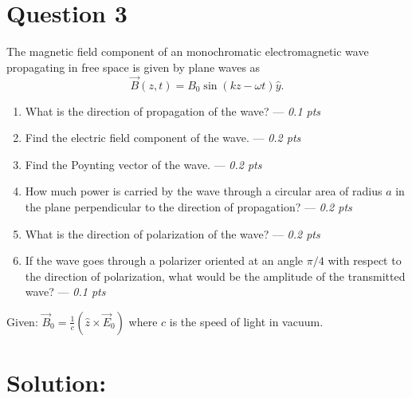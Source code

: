 \section*{Question 3}
The magnetic field component of an monochromatic electromagnetic wave propagating in free space is given by plane waves as
\begin{equation*}
\vec{B}(z,t) = B_0 \sin(kz - \omega t) \hat{y}.
\end{equation*}
\begin{enumerate}
    \item[(a)] What is the direction of propagation of the wave? --- \textit{0.1 pts} 
    \item[(b)] Find the electric field component of the wave. --- \textit{0.2 pts}
    \item[(c)] Find the Poynting vector of the wave. --- \textit{0.2 pts}
    \item[(d)] How much power is carried by the wave through a circular area of radius \(a\) in the plane perpendicular to the direction of propagation? --- \textit{0.2 pts}
    \item[(e)] What is the  direction of polarization of the wave? --- \textit{0.2 pts} 
    \item[(f)] If the wave goes through a polarizer oriented at an angle $\pi/4$ with respect to the direction of polarization, what would be the amplitude of the transmitted wave? --- \textit{0.1 pts} 
\end{enumerate}
\noindent
Given: $\vec{B}_0 = \frac{1}{c} (\hat{z}\times \vec{E}_0)$ where $c$ is the speed of light in vacuum.
\section*{Solution:}

